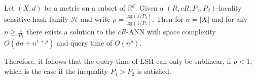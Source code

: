\begin{theorem}
    Let $(X,d)$ be a metric on a subset of $\mathbb{R}^d$. Given a $(R, cR, P_1, P_2)$-locality sensitive hash family $\mathcal{H}$ and write $\rho = \frac{\text{log}(1/P_1)}{\text{log}(1/P_2)}$. Then for $n = |X|$ and for any $n \geq \frac{1}{P_2}$ there exists a solution to the $cR$-ANN with space complexity $O(dn+n^{1+\rho})$ and query time of $O(n^{\rho})$.
\end{theorem}

Therefore, it follows that the query time of LSH can only be sublinear, if $\rho < 1$, which is the case if the inequality $P_1 > P_2$ is satisfied.

